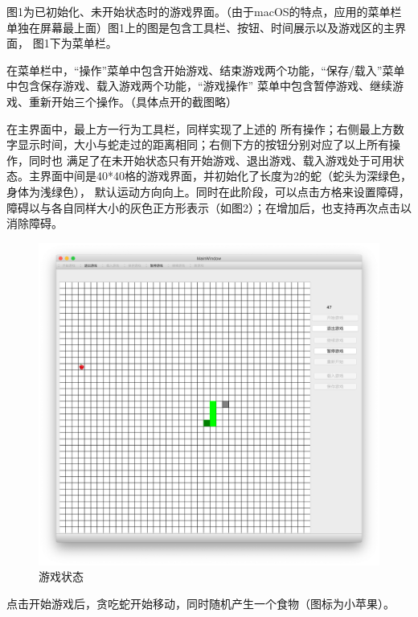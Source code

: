 \documentclass[utf-8]{ctexart}
\begin{document}
    \par 图1为已初始化、未开始状态时的游戏界面。（由于macOS的特点，应用的菜单栏单独在屏幕最上面）图1上的图是包含工具栏、按钮、时间展示以及游戏区的主界面，
    图1下为菜单栏。\par 在菜单栏中，“操作”菜单中包含开始游戏、结束游戏两个功能，“保存/载入”菜单中包含保存游戏、载入游戏两个功能，“游戏操作”
    菜单中包含暂停游戏、继续游戏、重新开始三个操作。（具体点开的截图略）\par 在主界面中，最上方一行为工具栏，同样实现了上述的
    所有操作；右侧最上方数字显示时间，大小与蛇走过的距离相同；右侧下方的按钮分别对应了以上所有操作，同时也
    满足了在未开始状态只有开始游戏、退出游戏、载入游戏处于可用状态。主界面中间是40*40格的游戏界面，并初始化了长度为2的蛇（蛇头为深绿色，身体为浅绿色），
    默认运动方向向上。同时在此阶段，可以点击方格来设置障碍，障碍以与各自同样大小的灰色正方形表示（如图2）；在增加后，也支持再次点击以消除障碍。

    \begin{figure}[ht]
        \centering
        \includegraphics[scale = 0.3]{texsrc/开始游戏.png}
        \caption{游戏状态}
        \label{gaming}
    \end{figure}
    \par 点击开始游戏后，贪吃蛇开始移动，同时随机产生一个食物（图标为小苹果）。
\end{document}
